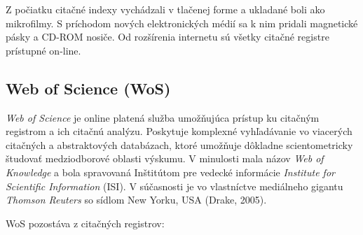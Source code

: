 Z počiatku citačné indexy vychádzali v tlačenej forme a ukladané boli ako
mikrofilmy.  S príchodom nových elektronických médií sa k nim pridali magnetické
pásky a CD-ROM nosiče.  Od rozšírenia internetu sú všetky citačné registre
prístupné on-line.

\subsection{Web of Science (WoS)}

\emph{Web of Science} je online platená služba umožňujúca prístup ku citačným
registrom a ich citačnú analýzu. Poskytuje komplexné vyhľadávanie vo viacerých
citačných a abstraktových databázach, ktoré umožňuje dôkladne scientometricky
študovať medziodborové oblasti výskumu.  V minulosti mala názov \emph{Web of
  Knowledge} a bola spravovaná Inštitútom pre vedecké informácie \emph{Institute
  for Scientific Information} (ISI). V súčasnosti je vo vlastníctve mediálneho
gigantu \emph{Thomson Reuters} so sídlom New Yorku, USA (Drake, 2005).

WoS pozostáva z citačných registrov:


